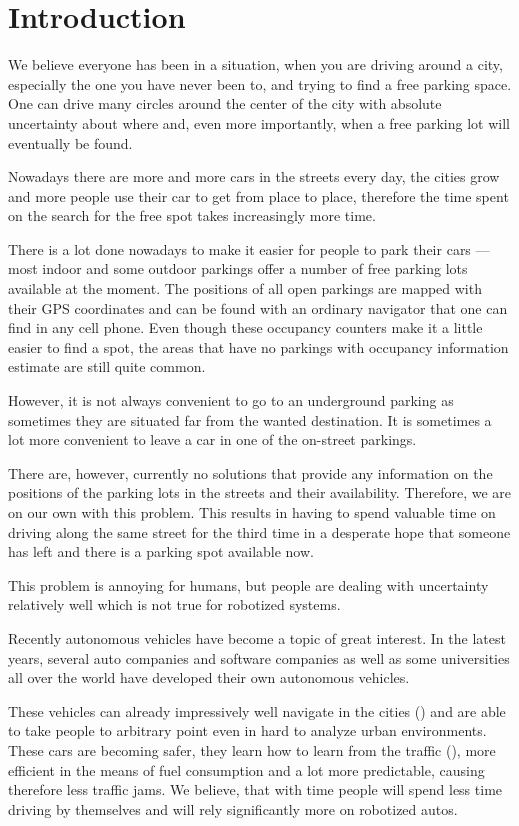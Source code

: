 \chapter{Introduction} %
\label{cha:introduction}
    We believe everyone has been in a situation, when you are driving around a city, especially the one you have never been to, and trying to find a free parking space. One can drive many circles around the center of the city with absolute uncertainty about where and, even more importantly, when a free parking lot will eventually be found.

    Nowadays there are more and more cars in the streets every day, the cities grow and more people use their car to get from place to place, therefore the time spent on the search for the free spot takes increasingly more time.

    There is a lot done nowadays to make it easier for people to park their cars --- most indoor and some outdoor parkings offer a number of free parking lots available at the moment. The positions of all open parkings are mapped with their GPS coordinates and can be found with an ordinary navigator that one can find in any cell phone. Even though these occupancy counters make it a little easier to find a spot, the areas that have no parkings with occupancy information estimate are still quite common.

    However, it is not always convenient to go to an underground parking as sometimes they are situated far from the wanted destination. It is sometimes a lot more convenient to leave a car in one of the on-street parkings.

    There are, however, currently no solutions that provide any information on the positions of the parking lots in the streets and their availability. Therefore, we are on our own with this problem. This results in having to spend valuable time on driving along the same street for the third time in a desperate hope that someone has left and there is a parking spot available now.

    This problem is annoying for humans, but people are dealing with uncertainty relatively well which is not true for robotized systems.

    Recently autonomous vehicles have become a topic of great interest.
    In the latest years, several auto companies and software companies as well as some universities all over the world have developed their own autonomous vehicles.

    These vehicles can already impressively well navigate in the cities (\cite{stanley_auto_car,perceprion_drivec_car,lima13}) and are able to take people to arbitrary point even in hard to analyze urban environments. These cars are becoming safer, they learn how to learn from the traffic (\cite{behaviour_learning,spinello10:multiclass }), more efficient in the means of fuel consumption and a lot more predictable, causing therefore less traffic jams. We believe, that with time people will spend less time driving by themselves and will rely significantly more on robotized autos.

